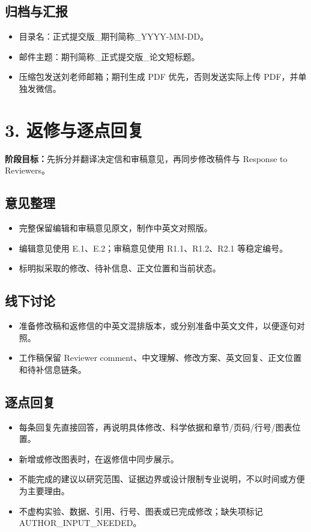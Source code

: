 \documentclass[UTF8,11pt]{ctexart}
\begin{document}
\subsection{归档与汇报}
\begin{itemize}
\item 目录名：正式提交版\_期刊简称\_YYYY-MM-DD。
\item 邮件主题：期刊简称\_正式提交版\_论文短标题。
\item 压缩包发送刘老师邮箱；期刊生成 PDF 优先，否则发送实际上传 PDF，并单独发微信。
\end{itemize}
\section{3. 返修与逐点回复}
\textbf{阶段目标：}先拆分并翻译决定信和审稿意见，再同步修改稿件与 Response to Reviewers。
\subsection{意见整理}
\begin{itemize}
\item 完整保留编辑和审稿意见原文，制作中英文对照版。
\item 编辑意见使用 E.1、E.2；审稿意见使用 R1.1、R1.2、R2.1 等稳定编号。
\item 标明拟采取的修改、待补信息、正文位置和当前状态。
\end{itemize}
\subsection{线下讨论}
\begin{itemize}
\item 准备修改稿和返修信的中英文混排版本，或分别准备中英文文件，以便逐句对照。
\item 工作稿保留 Reviewer comment、中文理解、修改方案、英文回复、正文位置和待补信息链条。
\end{itemize}
\subsection{逐点回复}
\begin{itemize}
\item 每条回复先直接回答，再说明具体修改、科学依据和章节/页码/行号/图表位置。
\item 新增或修改图表时，在返修信中同步展示。
\item 不能完成的建议以研究范围、证据边界或设计限制专业说明，不以时间或方便为主要理由。
\item 不虚构实验、数据、引用、行号、图表或已完成修改；缺失项标记 AUTHOR\_INPUT\_NEEDED。
\end{itemize}
\end{document}
